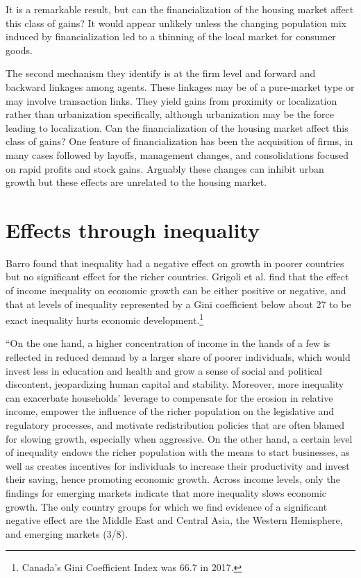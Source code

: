  It is a remarkable result, but can the financialization of the housing market affect this class of  gains? It would appear unlikely unless the changing population mix induced by financialization led to a thinning of the local market for consumer goods. 

 The second mechanism they identify is at the firm level and forward and backward linkages among agents. These linkages may be of a pure-market type or may involve transaction links. They yield  gains from proximity or localization rather than urbanization specifically, although urbanization may be the force leading to localization. Can the financialization of the housing market affect this class of  gains? One feature of financialization has been the acquisition of firms, in many cases followed by layoffs, management changes, and consolidations focused on rapid profits and stock gains. Arguably these changes can inhibit urban growth but these effects are unrelated to the housing market.
 

\section{Effects through inequality}
Barro \cite{barroInequalityGrowthInvestment1999} found that inequality had a negative effect on growth in poorer countries but no significant effect for the richer countries. Grigoli et al. \cite{grigoliInequalityGrowthHeterogeneous2016} find  that the effect of income inequality on economic growth can be either positive or negative, and that at levels  of inequality  represented by a Gini coefficient below about 27  to be exact inequality hurts economic development.\footnote{Canada's Gini Coefficient Index was 66.7 in 2017. } %

 ``On the one hand, a higher concentration of income in the hands of a few is reflected in reduced demand by a larger share of poorer individuals, which would invest less in education and health and grow a sense of social and political discontent, jeopardizing human capital and stability. Moreover, more inequality can exacerbate households’ leverage to compensate for the erosion in relative income, empower the influence of the richer population on the legislative and regulatory processes, and motivate redistribution policies that are often blamed for slowing growth, especially when aggressive. On the other hand, a certain level of inequality endows the richer population with the means to start businesses, as well as creates incentives for individuals to increase their productivity and invest their saving, hence promoting economic growth. Across income levels, only the findings for emerging markets indicate that more inequality slows economic growth. The only country groups for which we find evidence of a significant negative effect are the Middle East and Central Asia, the Western Hemisphere, and emerging markets (3/8).

